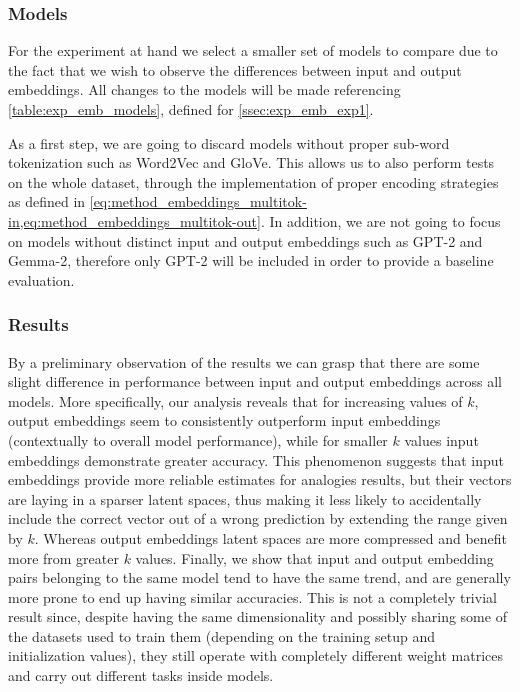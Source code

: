 \subsubsection{Models}\label{sssec:exp_emb_exp2_models}

For the experiment at hand we select a smaller set of models to compare due to the fact that we wish to observe the differences between input and output embeddings.
All changes to the models will be made referencing \cref{table:exp_emb_models}, defined for \cref{ssec:exp_emb_exp1}.

As a first step, we are going to discard models without proper sub-word tokenization such as Word2Vec and GloVe. 
This allows us to also perform tests on the whole dataset, through the implementation of proper encoding strategies as defined in \cref{eq:method_embeddings_multitok-in,eq:method_embeddings_multitok-out}.
In addition, we are not going to focus on models without distinct input and output embeddings such as GPT-2 and Gemma-2, therefore only GPT-2 will be included in order to provide a baseline evaluation.

\subsubsection{Results}


By a preliminary observation of the results we can grasp that there are some slight difference in performance between input and output embeddings across all models.
More specifically, our analysis reveals that for increasing values of $k$, output embeddings seem to consistently outperform input embeddings (contextually to overall model performance), while for smaller $k$ values input embeddings demonstrate greater accuracy.
This phenomenon suggests that input embeddings provide more reliable estimates for analogies results, but their vectors are laying in a sparser latent spaces, thus making it less likely to accidentally include the correct vector out of a wrong prediction by extending the range given by $k$.
Whereas output embeddings latent spaces are more compressed and benefit more from greater $k$ values.
Finally, we show that input and output embedding pairs belonging to the same model tend to have the same trend, and are generally more prone to end up having similar accuracies.
This is not a completely trivial result since, despite having the same dimensionality and possibly sharing some of the datasets used to train them (depending on the training setup and initialization values), they still operate with completely different weight matrices and carry out different tasks inside models.

